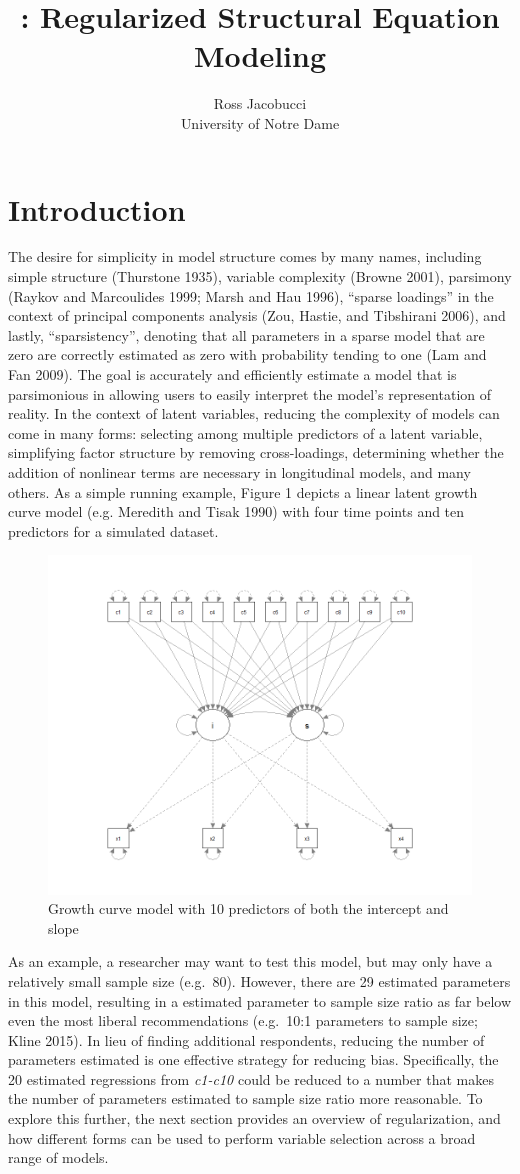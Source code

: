 \documentclass[article]{jss}
\author{
Ross Jacobucci\\University of Notre Dame
}
\title{\pkg{regsem}: Regularized Structural Equation Modeling}
\begin{document}
\setlength\parindent{24pt} \setlength{\parskip}{0.5em}

\section{Introduction}\label{introduction}

The desire for simplicity in model structure comes by many names,
including simple structure (Thurstone 1935), variable complexity (Browne
2001), parsimony (Raykov and Marcoulides 1999; Marsh and Hau 1996),
``sparse loadings'' in the context of principal components analysis
(Zou, Hastie, and Tibshirani 2006), and lastly, ``sparsistency'',
denoting that all parameters in a sparse model that are zero are
correctly estimated as zero with probability tending to one (Lam and Fan
2009). The goal is accurately and efficiently estimate a model that is
parsimonious in allowing users to easily interpret the model's
representation of reality. In the context of latent variables, reducing
the complexity of models can come in many forms: selecting among
multiple predictors of a latent variable, simplifying factor structure
by removing cross-loadings, determining whether the addition of
nonlinear terms are necessary in longitudinal models, and many others.
As a simple running example, Figure 1 depicts a linear latent growth
curve model (e.g. Meredith and Tisak 1990) with four time points and ten
predictors for a simulated dataset.

\begin{figure}
    \centering
    \includegraphics[width=.5\linewidth]{figs/growth_fig}
    \caption{Growth curve model with 10 predictors of both the intercept and slope}
\end{figure}

As an example, a researcher may want to test this model, but may only
have a relatively small sample size (e.g.~80). However, there are 29
estimated parameters in this model, resulting in a estimated parameter
to sample size ratio as far below even the most liberal recommendations
(e.g.~10:1 parameters to sample size; Kline 2015). In lieu of finding
additional respondents, reducing the number of parameters estimated is
one effective strategy for reducing bias. Specifically, the 20 estimated
regressions from \textit{c1-c10} could be reduced to a number that makes
the number of parameters estimated to sample size ratio more reasonable.
To explore this further, the next section provides an overview of
regularization, and how different forms can be used to perform variable
selection across a broad range of models.
\end{document}
